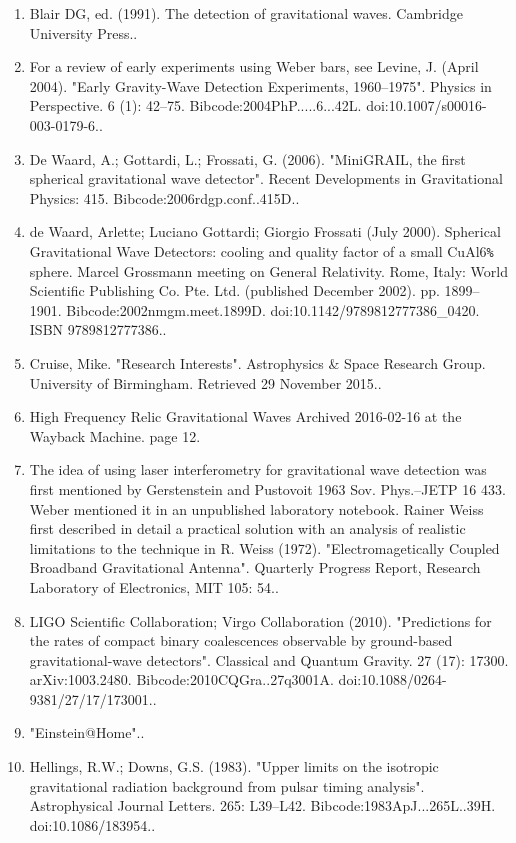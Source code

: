 \begin{enumerate}
\item Blair DG, ed. (1991). The detection of gravitational waves. Cambridge University Press..
\item For a review of early experiments using Weber bars, see Levine, J. (April 2004). "Early Gravity-Wave Detection Experiments, 1960–1975". Physics in Perspective. 6 (1): 42–75. Bibcode:2004PhP.....6...42L. doi:10.1007/s00016-003-0179-6..
\item De Waard, A.; Gottardi, L.; Frossati, G. (2006). "MiniGRAIL, the first spherical gravitational wave detector". Recent Developments in Gravitational Physics: 415. Bibcode:2006rdgp.conf..415D..
\item de Waard, Arlette; Luciano Gottardi; Giorgio Frossati (July 2000). Spherical Gravitational Wave Detectors: cooling and quality factor of a small CuAl6\verb`%` sphere. Marcel Grossmann meeting on General Relativity. Rome, Italy: World Scientific Publishing Co. Pte. Ltd. (published December 2002). pp. 1899–1901. Bibcode:2002nmgm.meet.1899D. doi:10.1142/9789812777386_0420. ISBN 9789812777386..
\item Cruise, Mike. "Research Interests". Astrophysics & Space Research Group. University of Birmingham. Retrieved 29 November 2015..
\item High Frequency Relic Gravitational Waves Archived 2016-02-16 at the Wayback Machine. page 12.
\item The idea of using laser interferometry for gravitational wave detection was first mentioned by Gerstenstein and Pustovoit 1963 Sov. Phys.–JETP 16 433. Weber mentioned it in an unpublished laboratory notebook. Rainer Weiss first described in detail a practical solution with an analysis of realistic limitations to the technique in R. Weiss (1972). "Electromagetically Coupled Broadband Gravitational Antenna". Quarterly Progress Report, Research Laboratory of Electronics, MIT 105: 54..
\item LIGO Scientific Collaboration; Virgo Collaboration (2010). "Predictions for the rates of compact binary coalescences observable by ground-based gravitational-wave detectors". Classical and Quantum Gravity. 27 (17): 17300. arXiv:1003.2480. Bibcode:2010CQGra..27q3001A. doi:10.1088/0264-9381/27/17/173001..
\item "Einstein@Home"..
\item Hellings, R.W.; Downs, G.S. (1983). "Upper limits on the isotropic gravitational radiation background from pulsar timing analysis". Astrophysical Journal Letters. 265: L39–L42. Bibcode:1983ApJ...265L..39H. doi:10.1086/183954..

\end{enumerate}
